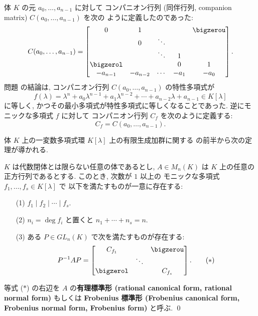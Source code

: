\documentclass[12pt,twoside]{jarticle}
\begin{document}
\medskip

体 $K$ の元 $a_0,\dots,a_{n-1}$ に対して
コンパニオン行列 (同伴行列, companion matrix) $C(a_0,\dots,a_{n-1})$ を次の
ように定義したのであった: 
\begin{equation*}
  C(a_0,\dots,a_{n-1}) =
  \begin{bmatrix}
    0         &    1     &        &      & \bigzerou \\
              &    0     & \ddots &      & \\
              &          & \ddots &  1   & \\
    \bigzerol &          &        &  0   &  1 \\
    -a_{n-1}  & -a_{n-2} & \cdots & -a_1 & -a_0 \\
  \end{bmatrix}.
\end{equation*}
問題  の結論は, 
コンパニオン行列 $C(a_0,\dots,a_{n-1})$ の特性多項式が
\begin{equation*}
  f(\lambda)
  = \lambda^n + a_0\lambda^{n-1} + a_1\lambda^{n-2}
  + \cdots + a_{n-2}\lambda + a_{n-1} \in K[\lambda]
\end{equation*}
に等しく, かつその最小多項式が特性多項式に等しくなることであった. 
逆にモニックな多項式 $f$ に対して
コンパニオン行列 $C_f$ を次のように定義する:
\begin{equation*}
  C_f = C(a_0,\dots,a_{n-1}).
\end{equation*}

体 $K$ 上の一変数多項式環 $K[\lambda]$ 上の有限生成加群に関する
の前半から次の定理が導かれる.

\begin{question}[正方行列の有理標準形]
\label{q:module-to-rational}
  $K$ は代数閉体とは限らない任意の体であるとし, 
  $A\in M_n(K)$ は $K$ 上の任意の正方行列であるとする. 
  このとき, 次数が $1$ 以上の
  モニックな多項式 $f_1,\dots,f_s\in K[\lambda]$ で
  以下を満たすものが一意に存在する:
  \begin{enumerate}
  \item[(1)] $f_1\mid f_2\mid\cdots\mid f_s$.
  \item[(2)] $n_i=\deg f_i$ と置くと $n_1+\cdots+n_s=n$.
  \item[(3)] ある $P\in GL_n(K)$ で次を満たすものが存在する:
    \begin{equation*}
      P^{-1}AP =
      \begin{bmatrix}
        C_{f_1} &        & \bigzerou \\
                & \ddots & \\
        \bigzerol &      & C_{f_s} \\
      \end{bmatrix}.
      \tag{$\ast$}
    \end{equation*}
  \end{enumerate}
  等式 ($\ast$) の右辺を $A$ の{\bf 有理標準形 (rational canonical form,
  rational normal form)} もしくは {\bf Frobenius 標準形 (Frobenius canonical
  form, Frobenius normal form, Frobenius form)} と呼ぶ.
  \qed
\end{question}
\end{document}
